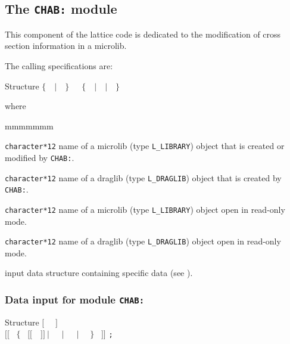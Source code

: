 \subsection{The {\tt CHAB:} module}\label{sect:CHABData}

This component of the lattice code is dedicated to the modification of cross section
information in a {\sc microlib}.

\vskip 0.02cm

The calling specifications are:

\begin{DataStructure}{Structure }
$\{$~~$|$~~$\}$~\moc{:=}~~$\{$~~$|$~~$|$~~$\}$~\moc{::}~ \\
\end{DataStructure}

\noindent where
\begin{ListeDeDescription}{mmmmmmm}

\item[\dusa{MICRO1}] {\tt character*12} name of a {\sc microlib} (type {\tt L\_LIBRARY}) object that is created or modified by {\tt CHAB:}.

\item[\dusa{DRAGLIB1}] {\tt character*12} name of a {\sc draglib} (type {\tt L\_DRAGLIB}) object that is created by {\tt CHAB:}.

\item[\dusa{MICRO2}] {\tt character*12} name of a {\sc microlib} (type {\tt L\_LIBRARY}) object open in read-only mode.

\item[\dusa{DRAGLIB2}] {\tt character*12} name of a {\sc draglib} (type {\tt L\_DRAGLIB}) object open in read-only mode.

\item[\dusa{CHAB\_data}] input data structure containing specific data (see ).

\end{ListeDeDescription}

\subsubsection{Data input for module {\tt CHAB:}}\label{sect:descCHAB}

\vskip -0.5cm

\begin{DataStructure}{Structure }
$[$~ ~$]$ \\
$[[$~     $\{$
~$[[$~~$]]~|$~~~$|$~~~$|$~~ $\}$ ~$]]$
{\tt ;}
\end{DataStructure}

